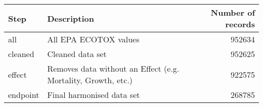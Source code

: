 
\begin{tabular}{l|l|r}
\hline
Step & Description & Number of records\\
\hline
all & All EPA ECOTOX values & 952634\\
\hline
cleaned & Cleaned data set & 952625\\
\hline
effect & Removes data without an Effect (e.g. Mortality, Growth, etc.) & 922575\\
\hline
endpoint & Final harmonised data set & 268785\\
\hline
\end{tabular}

